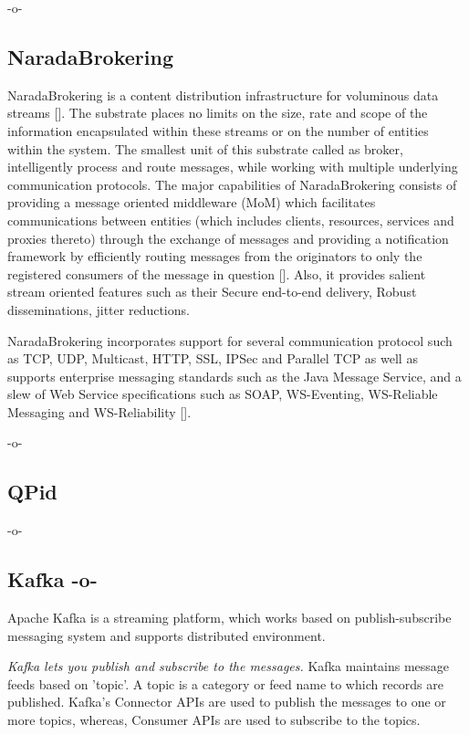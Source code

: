         -o-

\subsection{NaradaBrokering}

NaradaBrokering is a content distribution infrastructure for
voluminous data streams [\cite{www-narada}].  The substrate places no
limits on the size, rate and scope of the information encapsulated
within these streams or on the number of entities within the
system. The smallest unit of this substrate called as broker,
intelligently process and route messages, while working with multiple
underlying communication protocols. The major capabilities of
NaradaBrokering consists of providing a message oriented middleware
(MoM) which facilitates communications between entities (which
includes clients, resources, services and proxies thereto) through the
exchange of messages and providing a notification framework by
efficiently routing messages from the originators to only the
registered consumers of the message in
question [\cite{paper-nb-sustrate}]. Also, it provides salient stream
oriented features such as their Secure end-to-end delivery, Robust
disseminations, jitter reductions.

NaradaBrokering incorporates support for several communication
protocol such as TCP, UDP, Multicast, HTTP, SSL, IPSec and Parallel
TCP as well as supports enterprise messaging standards such as the
Java Message Service, and a slew of Web Service specifications such as
SOAP, WS-Eventing, WS-Reliable Messaging and
WS-Reliability [\cite{www-narada-features}].

     -o-

     
\subsection{QPid}

-o-

\subsection{Kafka -o-}

Apache Kafka is a streaming platform, which works based on
publish-subscribe messaging system and supports distributed
environment.
      
\textit{Kafka lets you publish and subscribe to the messages.}  Kafka
maintains message feeds based on 'topic'. A topic is a category or
feed name to which records are published. Kafka's Connector APIs are
used to publish the messages to one or more topics, whereas, Consumer
APIs are used to subscribe to the topics.

